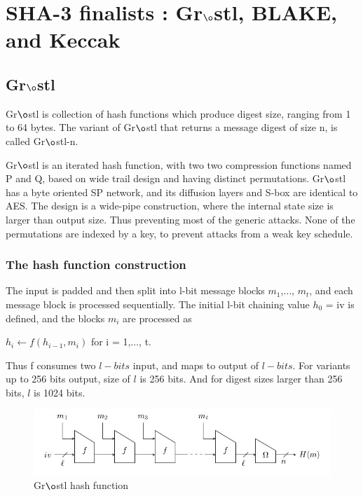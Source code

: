 \chapter{SHA-3 finalists : Gr$\o$stl, BLAKE, and Keccak}

\section{Gr$\o$stl}

Gr$\o$stl is collection of hash functions which produce digest size, ranging from 1 to 64 bytes. The variant of
Gr$\o$stl that returns a message digest of size n, is called Gr$\o$stl-n.

Gr$\o$stl is an iterated hash function, with two two compression functions named P and Q, based on wide trail design
and having distinct permutations. Gr$\o$stl has a byte oriented SP network, and its diffusion layers and S-box 
are identical to AES. The design is a wide-pipe construction, where the internal state size is larger than output 
size. Thus preventing most of the generic attacks. None of the permutations are indexed by a key, to prevent attacks
from a weak key schedule. \cite{00019}

  \subsection{The hash function construction}

  The input is padded and then split into l-bit message blocks $m_{1}$,$\ldots$, $m_{t}$, and each message block is
  processed sequentially. The initial l-bit chaining value $h_{0}$ = iv is defined, and the blocks $m_{i}$ are
  processed as 

  $ h_{i}\gets f(h_{i-1}, m_{i})$ for i = 1,$\ldots$, t. 

  Thus f consumes two $l-bits$ input, and maps to output of $l-bits$. For variants up to 256 bits output, size of $l$ is
  256 bits. And for digest sizes larger than 256 bits, $l$ is 1024 bits.

  \begin{figure}
    \begin{center}
      \includegraphics[width=5.5in]{groestlhashfunction.jpg}
    \end{center}
    \caption{Gr$\o$stl hash function}
    \label{fig:lab}
  \end{figure}

